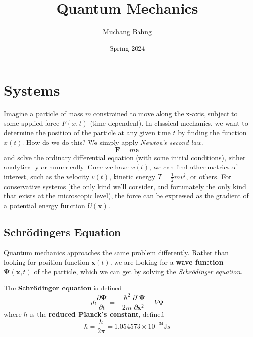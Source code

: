 \documentclass{article}
\begin{document}
\title{Quantum Mechanics}
\author{Muchang Bahng}
\date{Spring 2024}

\maketitle
\tableofcontents
\pagebreak

\section{Systems} 

  Imagine a particle of mass $m$ constrained to move along the x-axis, subject to some applied force $F(x, t)$ (time-dependent). In classical mechanics, we want to determine the position of the particle at any given time $t$ by finding the function $x(t)$. How do we do this? We simply apply \textit{Newton's second law}. 
  \begin{equation} 
    \mathbf{F} = m \mathbf{a}
  \end{equation}
  and solve the ordinary differential equation (with some initial conditions), either analytically or numerically. Once we have $x(t)$, we can find other metrics of interest, such as the velocity $v(t)$, kinetic energy $T = \frac{1}{2} mv^2$, or others. For conservative systems (the only kind we'll consider, and fortunately the only kind that exists at the microscopic level), the force can be expressed as the gradient of a potential energy function $U(\mathbf{x})$. 

  \subsection{Schr\"odingers Equation}

    Quantum mechanics approaches the same problem differently. Rather than looking for position function $\mathbf{x}(t)$, we are looking for a \textbf{wave function} $\boldsymbol{\Psi}(\mathbf{x}, t)$ of the particle, which we can get by solving the \textit{Schr\"odinger equation}. 

    \begin{definition}
      The \textbf{Schr\"odinger equation} is defined 
      \begin{equation} 
        i \hbar \frac{\partial \boldsymbol{\Psi}}{\partial t} = - \frac{\hbar^2}{2m} \frac{\partial^2 \boldsymbol{\Psi}}{\partial \mathbf{x}^2} + V \boldsymbol{\Psi}
      \end{equation}
      where $\hbar$ is the \textbf{reduced Planck's constant}, defined 
      \begin{equation} 
        \hbar = \frac{h}{2\pi} = 1.054573 \times 10^{-34} \mathrm{J}s
      \end{equation}
    \end{definition}
\end{document}
